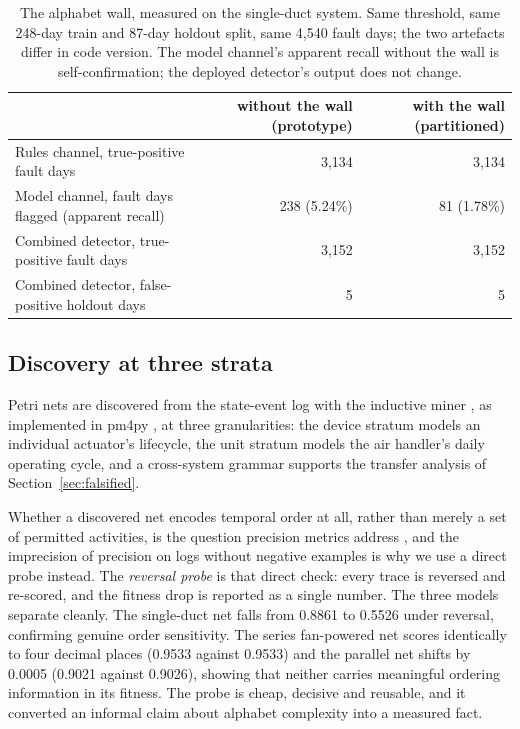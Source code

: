 \documentclass[11pt,letterpaper]{article}
\begin{document}
\begin{table}[htbp]
\centering
\caption{The alphabet wall, measured on the single-duct system. Same threshold, same 248-day train and 87-day holdout split, same 4{,}540 fault days; the two artefacts differ in code version. The model channel's apparent recall without the wall is self-confirmation; the deployed detector's output does not change.}
\label{tab:wall}
\small
\begin{tabular}{@{}lrr@{}}
\hline
 & without the wall (prototype) & with the wall (partitioned) \\
\hline
Rules channel, true-positive fault days & 3{,}134 & 3{,}134 \\
Model channel, fault days flagged (apparent recall) & 238 (5.24\%) & 81 (1.78\%) \\
Combined detector, true-positive fault days & 3{,}152 & 3{,}152 \\
Combined detector, false-positive holdout days & 5 & 5 \\
\hline
\end{tabular}
\end{table}

\subsection{Discovery at three strata}

Petri nets are discovered from the state-event log with the inductive miner \cite{leemans2013inductiveminer,leemans2014inductiveminerinfrequent}, as implemented in pm4py \cite{berti2023pm4py}, at three granularities: the device stratum models an individual actuator's lifecycle, the unit stratum models the air handler's daily operating cycle, and a cross-system grammar supports the transfer analysis of Section~\ref{sec:falsified}.

Whether a discovered net encodes temporal order at all, rather than merely a set of permitted activities, is the question precision metrics address \cite{munozgama2010precision,buijs2012quality,tax2018imprecisions}, and the imprecision of precision on logs without negative examples \cite{vandenbroucke2014negativeevents} is why we use a direct probe instead. The \emph{reversal probe} is that direct check: every trace is reversed and re-scored, and the fitness drop is reported as a single number. The three models separate cleanly. The single-duct net falls from 0.8861 to 0.5526 under reversal, confirming genuine order sensitivity. The series fan-powered net scores identically to four decimal places (0.9533 against 0.9533) and the parallel net shifts by 0.0005 (0.9021 against 0.9026), showing that neither carries meaningful ordering information in its fitness. The probe is cheap, decisive and reusable, and it converted an informal claim about alphabet complexity into a measured fact.
\end{document}

